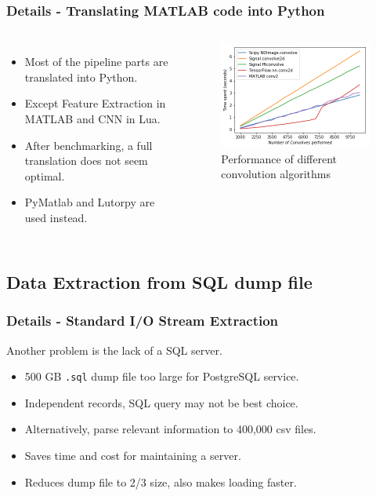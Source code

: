 \documentclass{beamer}[fullspacing]
\begin{document}
\begin{frame}
\frametitle{Details - Translating MATLAB code into Python}

\begin{columns}
\begin{itemize}
\item
Most of the pipeline parts are translated into Python.
\item
Except Feature Extraction in MATLAB and CNN in Lua.
\item
After benchmarking, a full translation does not seem optimal.
\item 
PyMatlab and Lutorpy are used instead.
\end{itemize}

\begin{figure}
\includegraphics[scale=0.3]{image/benchmark.png}
\caption{Performance of different convolution algorithms}
\end{figure}
\end{columns}

\end{frame}





\subsection{Data Extraction from SQL dump file}

\begin{frame}
\frametitle{Details - Standard I/O Stream Extraction}

Another problem is the lack of a SQL server.
\begin{itemize}
\item
500 GB {\tt .sql} dump file too large for PostgreSQL service.
\item
Independent records, SQL query may not be best choice.
\item
Alternatively, parse relevant information to 400,000 csv files.
\item
Saves time and cost for maintaining a server.
\item
Reduces dump file to 2/3 size, also makes loading faster.
\end{itemize}

\end{frame}
\end{document}
